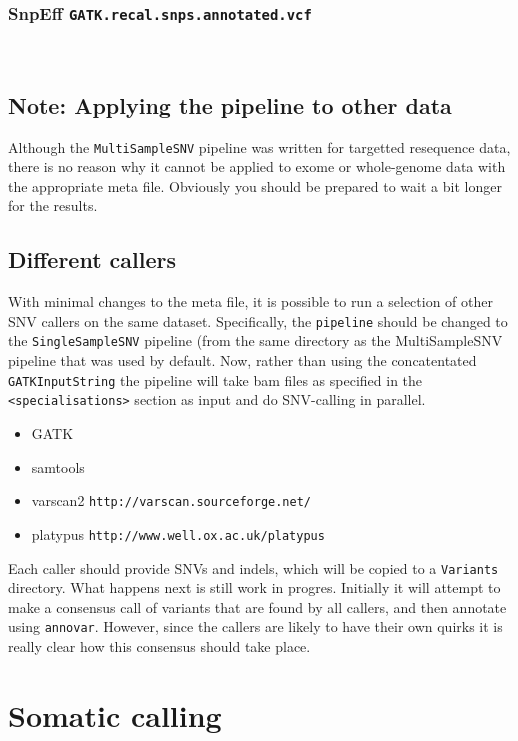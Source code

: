 \documentclass[a4paper,11pt]{article}
\begin{document}
\subsubsection{SnpEff {\tt GATK.recal.snps.annotated.vcf}}



\

\subsection{Note: Applying the pipeline to other data}

Although the {\tt MultiSampleSNV} pipeline was written for targetted resequence data, there is no reason why it cannot be applied to exome or whole-genome data with the appropriate meta file. Obviously you should be prepared to wait a bit longer for the results.


\subsection{Different callers}

With minimal changes to the meta file, it is possible to run a selection of other SNV callers on the same dataset. Specifically, the {\tt pipeline} should be changed to the {\tt SingleSampleSNV} pipeline (from the same directory as the MultiSampleSNV pipeline that was used by default. Now, rather than using the concatentated {\tt GATKInputString} the pipeline will take bam files as specified in the {\tt <specialisations>} section as input and do SNV-calling in parallel.

\begin{itemize}
 \item GATK
 \item samtools
 \item varscan2 {\tt http://varscan.sourceforge.net/}
 \item platypus {\tt http://www.well.ox.ac.uk/platypus}
\end{itemize}

Each caller should provide SNVs and indels, which will be copied to a {\tt Variants} directory. What happens next is still work in progres. Initially it will attempt to make a consensus call of variants that are found by all callers, and then annotate using {\tt annovar}. However, since the callers are likely to have their own quirks it is really clear how this consensus should take place.

\section{Somatic calling}
\end{document}

